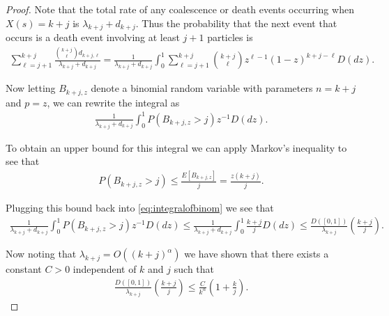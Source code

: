 \documentclass[10pt,a4paper]{amsart}
\begin{document}
\begin{proof}
   Note that the total rate of any coalescence or death events occurring when $X(s) = k+j$ is $\lambda_{k+j} +d_{k+j}$. Thus the probability that the next event that occurs is a death event involving at least $j + 1$ particles is
   \begin{align*}
       \sum_{\ell = j+1}^{k+j} \frac{\binom{k+j}{\ell}d_{k+j, \ell}}{\lambda_{k+j} +d_{k+j}} = \frac{1}{\lambda_{k+j} +d_{k+j}}\int_0^1\sum_{\ell = j+1}^{k+j}\binom{k+j}{\ell}z^{\ell-1}(1-z)^{k+j-\ell} D(dz).
   \end{align*}

   \noindent Now letting $B_{k+j,z}$ denote a binomial random variable with parameters $n= k+j$ and $p=z$, we can rewrite the integral as
   \begin{align}\label{eq:integralofbinom}
        \frac{1}{\lambda_{k+j} +d_{k+j}}\int_0^1 P(B_{k+j,z} > j)  z^{-1}D(dz).
   \end{align}

   \noindent To obtain an upper bound for this integral we can apply Markov's inequality to see that
   \begin{align*}
        P(B_{k+j,z} > j) \leq \frac{E[B_{k+j, z}]}{j} = \frac{z(k+j)}{j}.
   \end{align*}

   \noindent Plugging this bound back into \eqref{eq:integralofbinom} we see that
   \begin{align*}
       \frac{1}{\lambda_{k+j} +d_{k+j}}\int_0^1 P(B_{k+j,z} > j)  z^{-1}D(dz) \leq \frac{1}{\lambda_{k+j} +d_{k+j}}\int_0^1\frac{k+j}{j}D(dz) \leq \frac{D([0,1])}{\lambda_{k+j}}\left( \frac{k+j}{j}\right).
   \end{align*}
   
   \noindent Now noting that $\lambda_{k + j} = O((k+j)^\alpha)$ we have shown that there exists a constant $C > 0$ independent of $k$ and $j$ such that 
   \begin{align*}
       \frac{D([0,1])}{\lambda_{k+j}}\left( \frac{k+j}{j}\right) \leq \frac{C}{k^\alpha}\left(1 + \frac{k}{j}\right).
   \end{align*}

   \noindent 
\end{proof}
\end{document}
